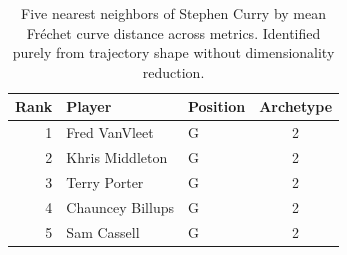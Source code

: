 \begin{table}[htbp]
  \centering\small
  \begin{tabular}{rllc}
    \toprule
    Rank & Player & Position & Archetype \\
    \midrule
    1 & Fred VanVleet & G & 2 \\
    2 & Khris Middleton & G & 2 \\
    3 & Terry Porter & G & 2 \\
    4 & Chauncey Billups & G & 2 \\
    5 & Sam Cassell & G & 2 \\
    \bottomrule
  \end{tabular}
  \caption{Five nearest neighbors of Stephen Curry by mean Fr\'{e}chet curve distance across metrics. Identified purely from trajectory shape without dimensionality reduction.}
  \label{tab:Stephen_Curry_frechet_curve_neighbors}
\end{table}

